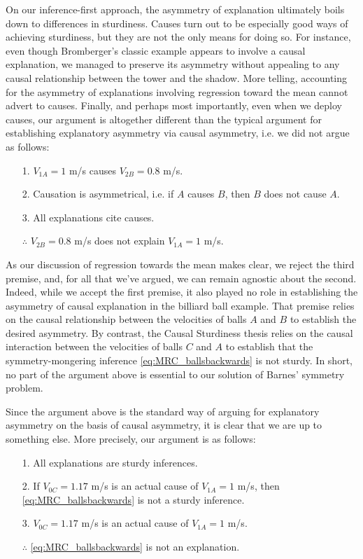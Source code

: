 \documentclass[natbib]{svjour3}                     %
\begin{document}
On our inference-first approach, the asymmetry of explanation ultimately boils down to differences in sturdiness. Causes turn out to be especially good ways of achieving sturdiness, but they are not the only means for doing so. For instance, even though Bromberger's classic example appears to involve a causal explanation, we managed to preserve its asymmetry without appealing to any causal relationship between the tower and the shadow. More telling, accounting for the asymmetry of explanations involving regression toward the mean cannot advert to causes. Finally, and perhaps most importantly, even when we deploy causes, our argument is altogether different than the typical argument for establishing explanatory asymmetry via causal asymmetry, i.e. we did not argue as follows:

\begin{itemize}
	\item [1.]$V_{1A} = 1$ m/s causes $V_{2B} = 0.8$ m/s.
	\item [2.]Causation is asymmetrical, i.e. if $A$ causes $B$, then $B$ does not cause $A$.
	\item [3.]All explanations cite causes.
	\item [$\therefore$] $V_{2B} = 0.8$ m/s does not explain $V_{1A} = 1$ m/s.
\end{itemize}

As our discussion of regression towards the mean makes clear, we reject the third premise, and, for all that we've argued, we can remain agnostic about the second. Indeed, while we accept the first premise, it also played no role in establishing the asymmetry of causal explanation in the billiard ball example. That premise relies on the causal relationship between the velocities of balls $A$ and $B$ to establish the desired asymmetry. By contrast, the Causal Sturdiness thesis relies on the causal interaction between the velocities of balls $C$ and $A$ to establish that the symmetry-mongering inference \ref{eq:MRC_ballsbackwards} is not sturdy. In short, no part of the argument above is essential to our solution of Barnes' symmetry problem. 

Since the argument above is the standard way of arguing for explanatory asymmetry on the basis of causal asymmetry, it is clear that we are up to something else. More precisely, our argument is as follows: 

	\begin{itemize}
		\item [1.]All explanations are sturdy inferences.
		\item [2.]If $V_{0C} = 1.17$ m/s is an actual cause of $V_{1A} = 1$ m/s, then \ref{eq:MRC_ballsbackwards}  is not a sturdy inference.
		\item [3.]$V_{0C} = 1.17$ m/s is an actual cause of $V_{1A} = 1$ m/s.
		\item [$\therefore$] \ref{eq:MRC_ballsbackwards} is not an explanation.
	\end{itemize}
	
\end{document}
